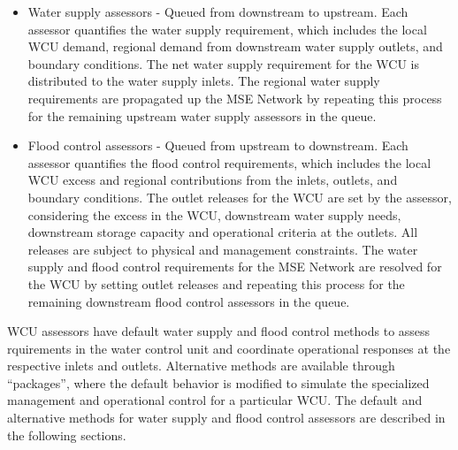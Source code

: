 \begin{itemize}
 \item Water supply assessors \-- Queued from downstream to upstream.
   Each assessor quantifies the water supply requirement, which
   includes the local WCU demand, regional demand from downstream
   water supply outlets, and boundary conditions.  The net water
   supply requirement for the WCU is distributed to the water supply inlets.
   The regional water supply requirements are propagated up the MSE Network
   by repeating this process for the remaining upstream water supply
   assessors in the queue.

 \item Flood control assessors \-- Queued from upstream to
   downstream. Each assessor quantifies the flood control
   requirements, which includes the local WCU excess and regional
   contributions from the inlets, outlets, and boundary
   conditions. The outlet releases for the WCU are set by the
   assessor, considering the excess in the WCU, downstream water
   supply needs, downstream storage capacity and operational criteria
   at the outlets. All releases are subject to physical and management
   constraints. The water supply and flood control requirements for
   the MSE Network are resolved for the WCU by setting outlet releases
   and repeating this process for the remaining downstream flood
   control assessors in the queue.
\end{itemize}

WCU assessors have default water supply and flood control methods to
assess rquirements in the water control unit and coordinate
operational responses at the respective inlets and outlets.
Alternative methods are available through ``packages'', where the
default behavior is modified to simulate the specialized management
and operational control for a particular WCU.  The default and
alternative methods for water supply and flood control assessors are
described in the following sections.

